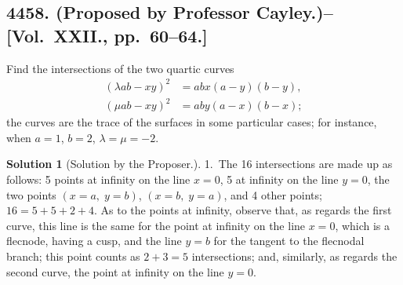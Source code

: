 \documentclass[11pt,a4paper]{article}
\theoremstyle{definition}
\newtheorem*{solution}{Solution}
\begin{document}
\newpage

\subsection*{4458. (Proposed by Professor Cayley.)\---[Vol.~XXII., pp.~60--64.]}

Find the intersections of the two quartic curves
\begin{align}
\label{eq:4458-1}
(\lambda ab - xy)^2 &= abx(a-y)(b-y), \\
\label{eq:4458-2}
(\mu ab - xy)^2 &= aby(a-x)(b-x);
\end{align}
the curves are the trace of the surfaces in some particular cases; for instance, when $a=1$, $b=2$, $\lambda=\mu=-2$.

\begin{solution}[Solution by the Proposer.]
1.~The 16 intersections are made up as follows: 5 points at infinity on the line $x=0$, 5 at infinity on the line $y=0$, the two points $(x=a,\; y=b)$, $(x=b,\; y=a)$, and 4 other points; $16 = 5+5+2+4$. As to the points at infinity, observe that, as regards the first curve, this line is the same for the point at infinity on the line $x=0$, which is a flecnode, having a cusp, and the line $y=b$ for the tangent to the flecnodal branch; this point counts as $2+3=5$ intersections; and, similarly, as regards the second curve, the point at infinity on the line $y=0$.


\end{solution}
\end{document}
